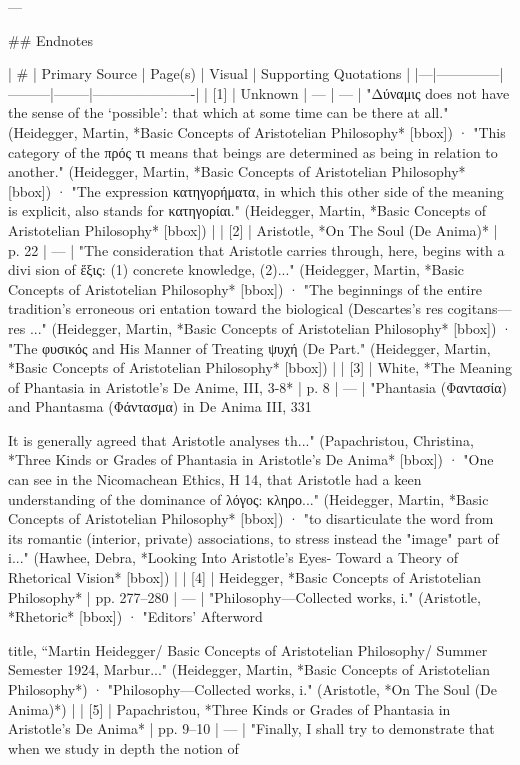 ---

## Endnotes

| # | Primary Source | Page(s) | Visual | Supporting Quotations |
|---|--------------|---------|--------|----------------------|
| [1] | Unknown | — | — | "Δύναμις does not have the sense of the ‘possible’: 
that which at some time can be there at all." (Heidegger, Martin, *Basic Concepts of Aristotelian Philosophy* [bbox]) · "This category of the πρός τι means that beings are determined as being in relation to another." (Heidegger, Martin, *Basic Concepts of Aristotelian Philosophy* [bbox]) · "The expression κατηγορήματα, in which this other side of the meaning is explicit, also stands for κατηγορίαι." (Heidegger, Martin, *Basic Concepts of Aristotelian Philosophy* [bbox]) |
| [2] | Aristotle, *On The Soul (De Anima)* | p. 22 | — | "The consideration that Aristotle carries through, here, begins with a divi­ sion of ἕξις: (1) concrete knowledge, (2)..." (Heidegger, Martin, *Basic Concepts of Aristotelian Philosophy* [bbox]) · "The beginnings of the entire tradition’s erroneous ori­ entation toward the biological (Descartes’s res cogitans—res ..." (Heidegger, Martin, *Basic Concepts of Aristotelian Philosophy* [bbox]) · "The φυσικός and His Manner of Treating ψυχή (De Part." (Heidegger, Martin, *Basic Concepts of Aristotelian Philosophy* [bbox]) |
| [3] | White, *The Meaning of Phantasia in Aristotle's De Anime, III, 3-8* | p. 8 | — | "Phantasia (Φαντασία) and Phantasma (Φάντασμα) in De Anima III, 331

It is generally agreed that Aristotle analyses th..." (Papachristou, Christina, *Three Kinds or Grades of Phantasia in Aristotle's De Anima* [bbox]) · "One can see in the Nicomachean Ethics, Η 14, that Aristotle had a keen understanding of the dominance of λόγος: κληρο..." (Heidegger, Martin, *Basic Concepts of Aristotelian Philosophy* [bbox]) · "to disarticulate the word from its romantic (interior, private) associations, to stress instead the "image" part of i..." (Hawhee, Debra, *Looking Into Aristotle's Eyes- Toward a Theory of Rhetorical Vision* [bbox]) |
| [4] | Heidegger, *Basic Concepts of Aristotelian Philosophy* | pp. 277–280 | — | "Philosophy—Collected works, i." (Aristotle, *Rhetoric* [bbox]) · "Editors' Afterword

title, “Martin Heidegger/ Basic Concepts of Aristotelian Philosophy/ Summer Semester 1924, Marbur..." (Heidegger, Martin, *Basic Concepts of Aristotelian Philosophy*) · "Philosophy—Collected works, i." (Aristotle, *On The Soul (De Anima)*) |
| [5] | Papachristou, *Three Kinds or Grades of Phantasia in Aristotle's De Anima* | pp. 9–10 | — | "Finally, I shall try to demonstrate that when we study in depth the notion of

